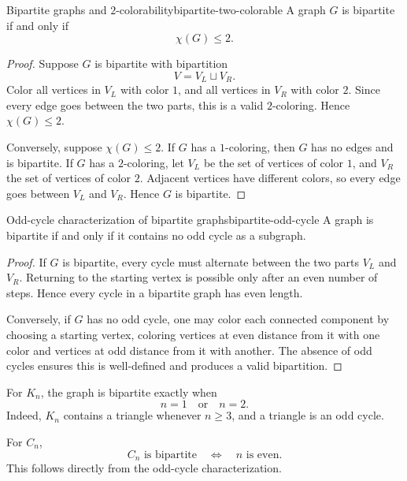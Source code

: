 \begin{theorem}{Bipartite graphs and \(2\)-colorability}{bipartite-two-colorable}
A graph \(G\) is bipartite if and only if
\[
\chi(G)\le 2.
\]
\end{theorem}

\begin{proof}
Suppose \(G\) is bipartite with bipartition
\[
V=V_L\sqcup V_R.
\]
Color all vertices in \(V_L\) with color \(1\), and all vertices in \(V_R\) with color \(2\). Since every edge goes between the two parts, this is a valid \(2\)-coloring. Hence \(\chi(G)\le 2\).

Conversely, suppose \(\chi(G)\le 2\). If \(G\) has a \(1\)-coloring, then \(G\) has no edges and is bipartite. If \(G\) has a \(2\)-coloring, let \(V_L\) be the set of vertices of color \(1\), and \(V_R\) the set of vertices of color \(2\). Adjacent vertices have different colors, so every edge goes between \(V_L\) and \(V_R\). Hence \(G\) is bipartite.
\end{proof}

\begin{theorem}{Odd-cycle characterization of bipartite graphs}{bipartite-odd-cycle}
A graph is bipartite if and only if it contains no odd cycle as a subgraph.
\end{theorem}

\begin{proof}
If \(G\) is bipartite, every cycle must alternate between the two parts \(V_L\) and \(V_R\). Returning to the starting vertex is possible only after an even number of steps. Hence every cycle in a bipartite graph has even length.

Conversely, if \(G\) has no odd cycle, one may color each connected component by choosing a starting vertex, coloring vertices at even distance from it with one color and vertices at odd distance from it with another. The absence of odd cycles ensures this is well-defined and produces a valid bipartition.
\end{proof}

\begin{examplebox}[title={Tutorial 9, Question 3}]
For \(K_n\), the graph is bipartite exactly when
\[
n=1\quad\text{or}\quad n=2.
\]
Indeed, \(K_n\) contains a triangle whenever \(n\ge 3\), and a triangle is an odd cycle.

For \(C_n\),
\[
C_n\text{ is bipartite}
\quad\Longleftrightarrow\quad
n\text{ is even}.
\]
This follows directly from the odd-cycle characterization.
\end{examplebox}

